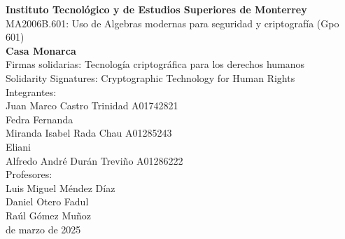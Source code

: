 \begin{center}
\Large{\textbf{Instituto Tecnológico y de Estudios Superiores de Monterrey}}\\
\Large{MA2006B.601: Uso de Algebras modernas para seguridad y criptografía (Gpo 601)}\\
\Large{\textbf{Casa Monarca}}\\
\Large{\fontsize{13pt}{12pt}\selectfont
Firmas solidarias: Tecnología criptográfica para los derechos humanos}\\ %
\Large{\fontsize{13pt}{12pt}\selectfont
Solidarity Signatures: Cryptographic Technology for Human Rights}\\ %
\Large{Integrantes:}\\ 
\fontsize{12pt}{12pt}\selectfont
Juan Marco Castro Trinidad A01742821\\
Fedra Fernanda\\
Miranda Isabel Rada Chau A01285243\\
Eliani\\
Alfredo André Durán Treviño A01286222\\
\Large{Profesores:}\\ 
\fontsize{12pt}{12pt}\selectfont %
Luis Miguel Méndez Díaz\\
Daniel Otero Fadul\\
Raúl Gómez Muñoz \\
\fontsize{17pt}{12pt} de marzo de 2025

%

\end{center}
\newpage